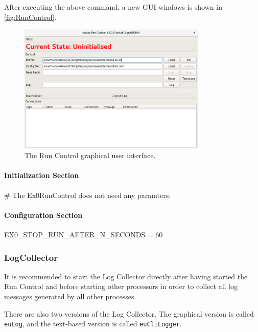 After executing the above command, a new GUI windows is shown in \autoref{fig:RunControl}.
\begin{figure}[htb]
  \begin{center}
    \includegraphics[width=0.8\textwidth]{src/images/eurun_ui}
    \caption{The Run Control graphical user interface.}
    \label{fig:RunControl}
  \end{center}
\end{figure}

\paragraph{Initialization Section}
\begin{listing}[conf]
[RunControl]
# The Ex0RunControl does not need any paramters.
\end{listing}

\paragraph{Configuration Section}
\begin{listing}[conf]
[RunControl]
EX0_STOP_RUN_AFTER_N_SECONDS = 60
\end{listing}

\subsubsection{LogCollector}
\label{sec:logcollector}
It is recommended to start the Log Collector directly after having started the Run Control and before starting other processors in order to collect all log messages generated by all other processes.

There are also two versions of the Log Collector.
The graphical version is called \texttt{euLog},
and the text-based version is called \texttt{euCliLogger}.


